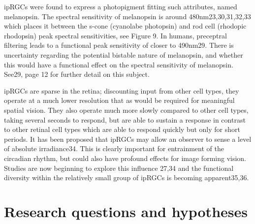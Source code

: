 \Glspl{ipRGC} were found to express a photopigment fitting such attributes, named melanopsin. The spectral sensitivity of melanopsin is around 480nm23,30,31,32,33 which places it between the s-cone (cyanolabe photopsin) and rod cell (rhodopic rhodopsin) peak spectral sensitivities, see Figure 9. In humans, preceptral filtering leads to a functional peak sensitivity of closer to 490nm29. There is uncertainty regarding the potential bistable nature of melanopsin, and whether this would have a functional effect on the spectral sensitivity of melanopsin. See29, page 12 for further detail on this subject.

\Glspl{ipRGC} are sparse in the retina; discounting input from other cell types, they operate at a much lower resolution that as would be required for meaningful spatial vision. They also operate much more slowly compared to other cell types, taking several seconds to respond, but are able to sustain a response in contrast to other retinal cell types which are able to respond quickly but only for short periods.
It has been proposed that \glspl{ipRGC} may allow an observer to sense a level of absolute irradiance34. This is clearly important for entrainment of the circadian rhythm, but could also have profound effects for image forming vision. Studies are now beginning to explore this influence 27,34 and the functional diversity within the relatively small group of \glspl{ipRGC} is becoming apparent35,36. 



\section{Research questions and hypotheses}
